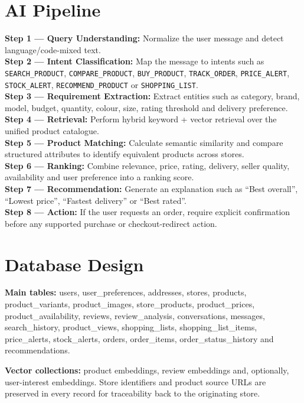 \documentclass[12pt,a4paper]{article}
\begin{document}
\section{AI Pipeline}

\noindent\textbf{Step 1 --- Query Understanding:} Normalize the user message and detect language/code-mixed text.\\
\textbf{Step 2 --- Intent Classification:} Map the message to intents such as \texttt{SEARCH\_PRODUCT},
\texttt{COMPARE\_PRODUCT}, \texttt{BUY\_PRODUCT}, \texttt{TRACK\_ORDER}, \texttt{PRICE\_ALERT},
\texttt{STOCK\_ALERT}, \texttt{RECOMMEND\_PRODUCT} or \texttt{SHOPPING\_LIST}.\\
\textbf{Step 3 --- Requirement Extraction:} Extract entities such as category, brand, model, budget, quantity,
colour, size, rating threshold and delivery preference.\\
\textbf{Step 4 --- Retrieval:} Perform hybrid keyword + vector retrieval over the unified product catalogue.\\
\textbf{Step 5 --- Product Matching:} Calculate semantic similarity and compare structured attributes to identify
equivalent products across stores.\\
\textbf{Step 6 --- Ranking:} Combine relevance, price, rating, delivery, seller quality, availability and user
preference into a ranking score.\\
\textbf{Step 7 --- Recommendation:} Generate an explanation such as ``Best overall'', ``Lowest price'', ``Fastest
delivery'' or ``Best rated''.\\
\textbf{Step 8 --- Action:} If the user requests an order, require explicit confirmation before any supported
purchase or checkout-redirect action.

\section{Database Design}

\noindent\textbf{Main tables:} users, user\_preferences, addresses, stores, products, product\_variants,
product\_images, store\_products, product\_prices, product\_availability, reviews, review\_analysis,
conversations, messages, search\_history, product\_views, shopping\_lists, shopping\_list\_items, price\_alerts,
stock\_alerts, orders, order\_items, order\_status\_history and recommendations.

\noindent\textbf{Vector collections:} product embeddings, review embeddings and, optionally, user-interest
embeddings. Store identifiers and product source URLs are preserved in every record for traceability back to the
originating store.
\end{document}
